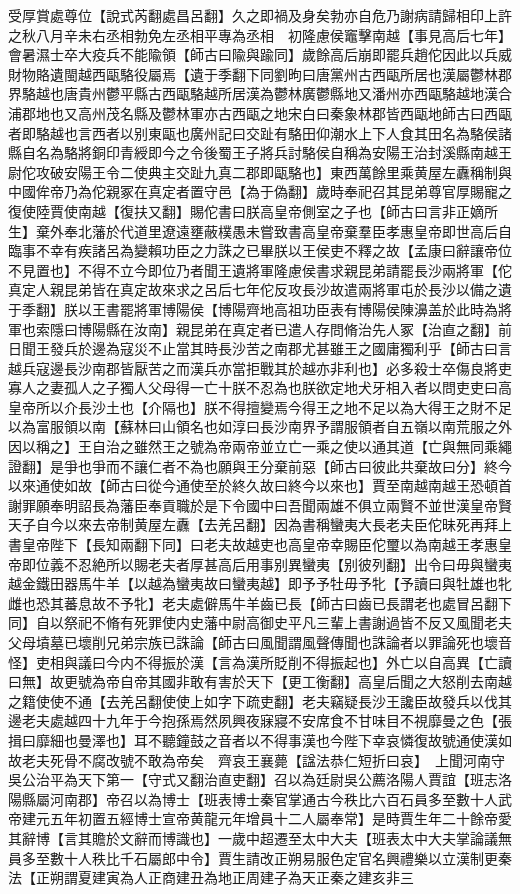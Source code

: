 受厚賞處尊位【說式芮翻處昌呂翻】久之即禍及身矣勃亦自危乃謝病請歸相印上許之秋八月辛未右丞相勃免左丞相平專為丞相　初隆慮侯竈擊南越【事見高后七年】會暑濕士卒大疫兵不能隃領【師古曰隃與踰同】歲餘高后崩即罷兵趙佗因此以兵威財物賂遺閩越西甌駱役屬焉【遺于季翻下同劉昫曰唐黨州古西甌所居也漢屬鬱林郡界駱越也唐貴州鬱平縣古西甌駱越所居漢為鬱林廣鬱縣地又潘州亦西甌駱越地漢合浦郡地也又高州茂名縣及鬱林軍亦古西甌之地宋白曰秦象林郡皆西甌地師古曰西甌者即駱越也言西者以别東甌也廣州記曰交趾有駱田仰潮水上下人食其田名為駱侯諸縣自名為駱將銅印青綬即今之令後蜀王子將兵討駱侯自稱為安陽王治封溪縣南越王尉佗攻破安陽王令二使典主交趾九真二郡即甌駱也】東西萬餘里乘黄屋左纛稱制與中國侔帝乃為佗親冢在真定者置守邑【為于偽翻】歲時奉祀召其昆弟尊官厚賜寵之復使陸賈使南越【復扶又翻】賜佗書曰朕高皇帝側室之子也【師古曰言非正嫡所生】棄外奉北藩於代道里遼遠壅蔽樸愚未嘗致書高皇帝棄羣臣孝惠皇帝即世高后自臨事不幸有疾諸呂為變賴功臣之力誅之已畢朕以王侯吏不釋之故【孟康曰辭讓帝位不見置也】不得不立今即位乃者聞王遺將軍隆慮侯書求親昆弟請罷長沙兩將軍【佗真定人親昆弟皆在真定故來求之呂后七年佗反攻長沙故遣兩將軍屯於長沙以備之遺于季翻】朕以王書罷將軍博陽侯【博陽齊地高祖功臣表有博陽侯陳濞盖於此時為將軍也索隱曰博陽縣在汝南】親昆弟在真定者已遣人存問脩治先人冢【治直之翻】前日聞王發兵於邊為寇災不止當其時長沙苦之南郡尤甚雖王之國庸獨利乎【師古曰言越兵寇邊長沙南郡皆厭苦之而漢兵亦當拒戰其於越亦非利也】必多殺士卒傷良將吏寡人之妻孤人之子獨人父母得一亡十朕不忍為也朕欲定地犬牙相入者以問吏吏曰高皇帝所以介長沙土也【介隔也】朕不得擅變焉今得王之地不足以為大得王之財不足以為富服領以南【蘇林曰山領名也如淳曰長沙南界予謂服領者自五嶺以南荒服之外因以稱之】王自治之雖然王之號為帝兩帝並立亡一乘之使以通其道【亡與無同乘繩證翻】是爭也爭而不讓仁者不為也願與王分棄前惡【師古曰彼此共棄故曰分】終今以來通使如故【師古曰從今通使至於終久故曰終今以來也】賈至南越南越王恐頓首謝罪願奉明詔長為藩臣奉貢職於是下令國中曰吾聞兩雄不俱立兩賢不並世漢皇帝賢天子自今以來去帝制黄屋左纛【去羌呂翻】因為書稱蠻夷大長老夫臣佗昧死再拜上書皇帝陛下【長知兩翻下同】曰老夫故越吏也高皇帝幸賜臣佗璽以為南越王孝惠皇帝即位義不忍絶所以賜老夫者厚甚高后用事别異蠻夷【别彼列翻】出令曰毋與蠻夷越金鐵田器馬牛羊【以越為蠻夷故曰蠻夷越】即予予牡毋予牝【予讀曰與牡雄也牝雌也恐其蕃息故不予牝】老夫處僻馬牛羊齒已長【師古曰齒已長謂老也處冒呂翻下同】自以祭祀不脩有死罪使内史藩中尉高御史平凡三輩上書謝過皆不反又風聞老夫父母墳墓已壞削兄弟宗族已誅論【師古曰風聞謂風聲傳聞也誅論者以罪論死也壞音怪】吏相與議曰今内不得振於漢【言為漢所貶削不得振起也】外亡以自高異【亡讀曰無】故更號為帝自帝其國非敢有害於天下【更工衡翻】高皇后聞之大怒削去南越之籍使使不通【去羌呂翻使使上如字下疏吏翻】老夫竊疑長沙王讒臣故發兵以伐其邊老夫處越四十九年于今抱孫焉然夙興夜寐寢不安席食不甘味目不視靡曼之色【張揖曰靡細也曼澤也】耳不聽鐘鼓之音者以不得事漢也今陛下幸哀憐復故號通使漢如故老夫死骨不腐改號不敢為帝矣　齊哀王襄薨【諡法恭仁短折曰哀】　上聞河南守吳公治平為天下第一【守式又翻治直吏翻】召以為廷尉吳公薦洛陽人賈誼【班志洛陽縣屬河南郡】帝召以為博士【班表博士秦官掌通古今秩比六百石員多至數十人武帝建元五年初置五經博士宣帝黄龍元年增員十二人屬奉常】是時賈生年二十餘帝愛其辭博【言其贍於文辭而博識也】一歲中超遷至太中大夫【班表太中大夫掌論議無員多至數十人秩比千石屬郎中令】賈生請改正朔易服色定官名興禮樂以立漢制更秦法【正朔謂夏建寅為人正商建丑為地正周建子為天正秦之建亥非三